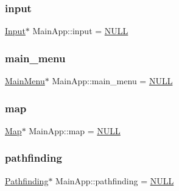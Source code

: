 \mbox{\label{class_main_app_a08bb55fc8d6fa5958250362012327477}} 
\subsubsection{\texorpdfstring{input}{input}}
{\footnotesize\ttfamily \mbox{\hyperlink{class_input}{Input}}$\ast$ Main\+App\+::input = \mbox{\hyperlink{_defs_8h_a070d2ce7b6bb7e5c05602aa8c308d0c4}{N\+U\+LL}}}

\mbox{\label{class_main_app_acf91e5617a0dc069b454c2b21ab07fe7}} 
\subsubsection{\texorpdfstring{main\_menu}{main\_menu}}
{\footnotesize\ttfamily \mbox{\hyperlink{class_main_menu}{Main\+Menu}}$\ast$ Main\+App\+::main\+\_\+menu = \mbox{\hyperlink{_defs_8h_a070d2ce7b6bb7e5c05602aa8c308d0c4}{N\+U\+LL}}}

\mbox{\label{class_main_app_ad8c323fb3c0e2cb5b118eeb058f463e0}} 
\subsubsection{\texorpdfstring{map}{map}}
{\footnotesize\ttfamily \mbox{\hyperlink{class_map}{Map}}$\ast$ Main\+App\+::map = \mbox{\hyperlink{_defs_8h_a070d2ce7b6bb7e5c05602aa8c308d0c4}{N\+U\+LL}}}

\mbox{\label{class_main_app_a095b19753a9468b930b9dbd0afa7fb18}} 
\subsubsection{\texorpdfstring{pathfinding}{pathfinding}}
{\footnotesize\ttfamily \mbox{\hyperlink{class_pathfinding}{Pathfinding}}$\ast$ Main\+App\+::pathfinding = \mbox{\hyperlink{_defs_8h_a070d2ce7b6bb7e5c05602aa8c308d0c4}{N\+U\+LL}}}

\mbox{\label{class_main_app_a75dcabc1589292588e912c93fbc92bcb}} 
